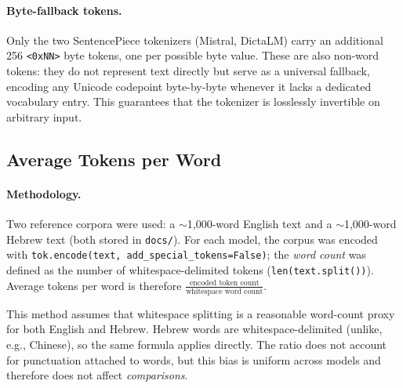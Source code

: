 \documentclass[11pt, a4paper]{article}
\begin{document}
\paragraph{Byte-fallback tokens.}
Only the two SentencePiece tokenizers (Mistral, DictaLM) carry an additional
256 \texttt{<0xNN>} byte tokens, one per possible byte value.  These are also
non-word tokens: they do not represent text directly but serve as a universal
fallback, encoding any Unicode codepoint byte-by-byte whenever it lacks a
dedicated vocabulary entry.  This guarantees that the tokenizer is losslessly
invertible on arbitrary input.

\subsection{Average Tokens per Word}

\paragraph{Methodology.}
Two reference corpora were used: a $\sim$1{,}000-word English text and a
$\sim$1{,}000-word Hebrew text (both stored in \texttt{docs/}).
For each model, the corpus was encoded with
\texttt{tok.encode(text, add\_special\_tokens=False)}; the \emph{word count}
was defined as the number of whitespace-delimited tokens
(\texttt{len(text.split())}).  Average tokens per word is therefore
$\frac{\text{encoded token count}}{\text{whitespace word count}}$.

This method assumes that whitespace splitting is a reasonable word-count proxy
for both English and Hebrew.  Hebrew words are whitespace-delimited (unlike,
e.g., Chinese), so the same formula applies directly.  The ratio does not
account for punctuation attached to words, but this bias is uniform across
models and therefore does not affect \emph{comparisons}.
\end{document}
